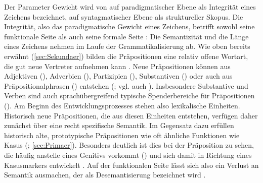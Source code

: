 Der Parameter Gewicht wird von \citet[]{Lehmann.1985} auf paradigmatischer Ebene als Integrität eines Zeichens bezeichnet, auf syntagmatischer Ebene als struktureller Skopus. 
Die Integrität, also das paradigmatische Gewicht eines Zeichens, betrifft sowohl seine funktionale Seite als auch seine formale Seite \citep[s.][305]{Lehmann.1985}: Die Semantizität und die Länge eines Zeichens nehmen im Laufe der Grammatikalisierung ab. 
Wie oben bereits erwähnt (\autoref{sec:Sekundaer}) bilden die Präpositionen eine relativ offene Wortart, die gut neue Vertreter aufnehmen kann \citep[518]{Eisenberg1979}. 
Neue Präpositionen können aus Adjektiven (), Adverbien (), Partizipien (), Substantiven () oder auch aus Präpositionalphrasen () entstehen (\cites[s.][66]{DiMeola2001}[215]{DiMeola2011}; vgl. auch \citealp{Braunmueller1985}).
Insbesondere Substantive und Verben sind auch sprach{\"u}bergreifend typische Spenderbereiche f{\"u}r Pr{\"a}positionen (\cites[672]{Kortmann.1992}[512]{Konig.2012}). 
Am Beginn des Entwicklungsprozesses stehen also lexikalische Einheiten. 
Historisch neue Präpositionen, die aus diesen Einheiten entstehen, verfügen daher zunächst über eine recht spezifische Semantik. 
Im Gegensatz dazu erfüllen historisch alte, prototypische Präpositionen wie  oft {\"a}hnliche Funktionen wie Kasus (\cite[s.][45]{Rauh1990}; \autoref{sec:Primaer}). 
Besonders deutlich ist dies bei der Präposition  zu sehen, die häufig anstelle eines Genitivs vorkommt () und sich damit in Richtung eines Kasusmarkers entwickelt \citep[s.][6]{Lehmann1992}. 
Auf der funktionalen Seite lässt sich also ein Verlust an Semantik ausmachen, der als Desemantisierung bezeichnet wird \citep[s.][493]{Lehmann.1991}.

